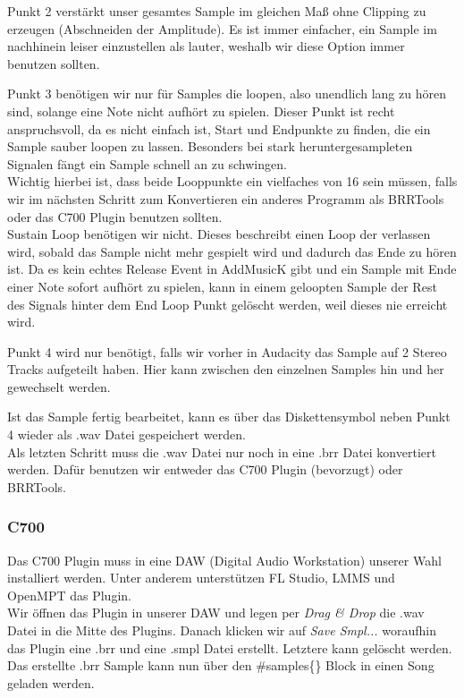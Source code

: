 \bigskip

Punkt 2 verstärkt unser gesamtes Sample im gleichen Maß ohne Clipping zu erzeugen (Abschneiden der Amplitude). Es ist immer einfacher, ein Sample im nachhinein leiser einzustellen als lauter, weshalb wir diese Option immer benutzen sollten.

\bigskip

Punkt 3 benötigen wir nur für Samples die loopen, also unendlich lang zu hören sind, solange eine Note nicht aufhört zu spielen.  Dieser Punkt ist recht anspruchsvoll, da es nicht einfach ist, Start und Endpunkte zu finden, die ein Sample sauber loopen zu lassen. Besonders bei stark heruntergesampleten Signalen fängt ein Sample schnell an zu \dq schwingen\dq{}. \\
Wichtig hierbei ist, dass beide Looppunkte ein vielfaches von 16 sein müssen, falls wir im nächsten Schritt zum Konvertieren ein anderes Programm als BRRTools oder das C700 Plugin benutzen sollten. \\
Sustain Loop benötigen wir nicht. Dieses beschreibt einen Loop der verlassen wird, sobald das Sample nicht mehr gespielt wird und dadurch das Ende zu hören ist. Da es kein echtes Release Event in AddMusicK gibt und ein Sample mit Ende einer Note sofort aufhört zu spielen, kann in einem geloopten Sample der Rest des Signals hinter dem End Loop Punkt gelöscht werden, weil dieses nie erreicht wird.


\bigskip

Punkt 4 wird nur benötigt, falls wir vorher in Audacity das Sample auf 2 Stereo Tracks aufgeteilt haben. Hier kann zwischen den einzelnen Samples hin und her gewechselt werden.

\bigskip

Ist das Sample fertig bearbeitet, kann es über das Diskettensymbol neben Punkt 4 wieder als .wav Datei gespeichert werden. \\
Als letzten Schritt muss die .wav Datei nur noch in eine .brr Datei konvertiert werden. Dafür benutzen wir entweder das C700 Plugin (bevorzugt) oder BRRTools.

\subsubsection*{C700}

Das C700 Plugin muss in eine DAW (Digital Audio Workstation) unserer Wahl installiert werden. Unter anderem unterstützen FL Studio, LMMS und OpenMPT das Plugin. \\
Wir öffnen das Plugin in unserer DAW und legen per \textit{Drag \& Drop} die .wav Datei in die Mitte des Plugins. Danach klicken wir auf \textit{Save Smpl...} woraufhin das Plugin eine .brr und eine .smpl Datei erstellt. Letztere kann gelöscht werden. Das erstellte .brr Sample kann nun über den \#samples\{\} Block in einen Song geladen werden.

